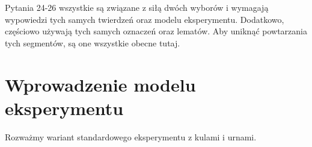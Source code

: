 {
\makeatletter
{}
\makeatother
\graphicspath{{../probabil}}

\label{two-choices-introduction}
Pytania 24-26 wszystkie są związane z siłą dwóch wyborów i wymagają wypowiedzi tych samych twierdzeń oraz modelu eksperymentu. Dodatkowo, częściowo używają tych samych oznaczeń oraz lematów. Aby uniknąć powtarzania tych segmentów, są one wszystkie obecne tutaj.

	{
		\let\realsection\section
		\let\realsubsection\subsection
		\let\subsection\section
		\let\subsubsection\paragraph

		\subsection{Wprowadzenie modelu eksperymentu}
		Rozważmy wariant standardowego eksperymentu z kulami i urnami.%
	}
}